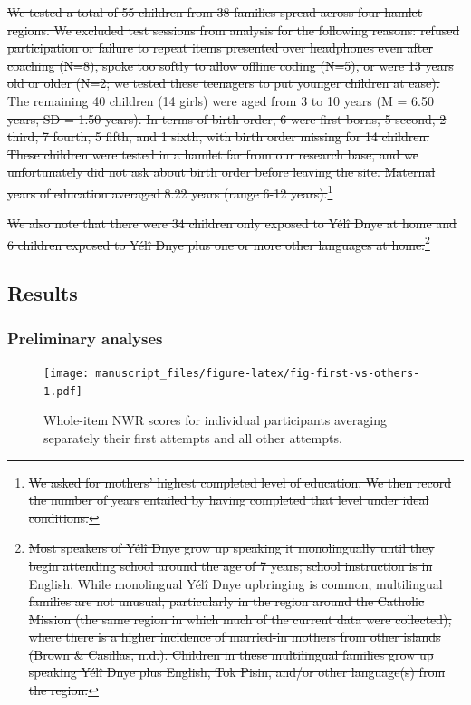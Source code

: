 \documentclass[ %
american, %
,man,floatsintext]{apa6} %
\providecommand{\DIFdeltex}[1]{{\protect\color{red}\sout{#1}}}                      %
\providecommand{\DIFdelend}{} %
\providecommand{\DIFdel}[1]{\texorpdfstring{\DIFdeltex{#1}}{}} %
\DeclareRobustCommand{\DIFdelend}{\DIFOaddend \let\includegraphics\DIFOincludegraphics} %
\begin{document}
\DIFdel{We tested a total of 55 children from 38 families spread across four hamlet regions. We excluded test sessions from analysis for the following reasons: refused participation or failure to repeat items presented over headphones even after coaching (N=8), spoke too softly to allow offline coding (N=5), or were 13 years old or older (N=2; we tested these teenagers to put younger children at ease). The remaining 40 children (14 girls) were aged from 3 to 10 years (M = 6.50 years, SD = 1.50 years). In terms of birth order, 6 were first borns, 5 second, 2 third, 7 fourth, 5 fifth, and 1 sixth, with birth order missing for 14 children. These children were tested in a hamlet far from our research base, and we unfortunately did not ask about birth order before leaving the site. Maternal years of education averaged 8.22 years (range 6-12 years).}\footnote{\DIFdel{We asked for mothers' highest completed level of education. We then record the number of years entailed by having completed that level under ideal conditions.}} %
\addtocounter{footnote}{-1}%
\DIFdel{We also note that there were 34 children only exposed to Yélî Dnye at home and 6 children exposed to Yélî Dnye plus one or more other languages at home.}\footnote{\DIFdel{Most speakers of Yélî Dnye grow up speaking it monolingually until they begin attending school around the age of 7 years; school instruction is in English. While monolingual Yélî Dnye upbringing is common, multilingual families are not unusual, particularly in the region around the Catholic Mission (the same region in which much of the current data were collected), where there is a higher incidence of married-in mothers from other islands (Brown \& Casillas, n.d.). Children in these multilingual families grow up speaking Yélî Dnye plus English, Tok Pisin, and/or other language(s) from the region.}}
\addtocounter{footnote}{-1}%

\DIFdelend \hypertarget{results}{%
	\subsection{Results}\label{results}}

\hypertarget{preliminary-analyses}{%
	\subsubsection{Preliminary analyses}\label{preliminary-analyses}}

\begin{figure}
	\centering
	\texttt{[image: manuscript\_files/figure-latex/fig-first-vs-others-1.pdf]}
	\caption{\label{fig:fig-first-vs-others}Whole-item NWR scores for individual participants averaging separately their first attempts and all other attempts.}
\end{figure}
\end{document}
